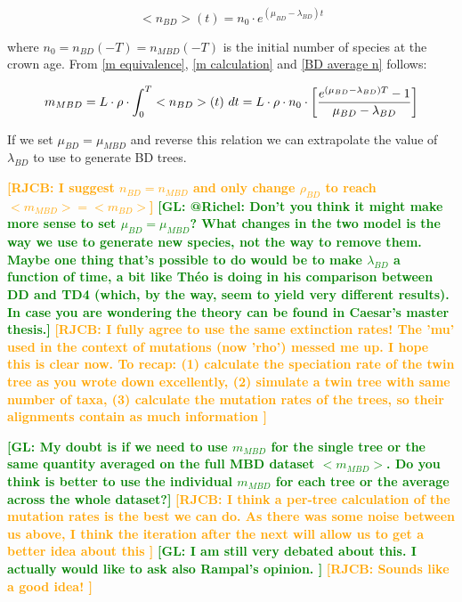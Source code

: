\documentclass{article}
\newcommand*\richel[1]{\textcolor{orange}{\textbf{[RJCB: #1]}}}
\newcommand*\gio[1]{\textcolor{green}{\textbf{[GL: #1]}}}
\begin{document}
\begin{itemize}
\begin{equation}
    <n_{BD}>(t) = n_{0} \cdot e^{(\mu_{BD} - \lambda_{BD})t} \label{BD average n}
\end{equation}

where $n_{0} = n_{BD}(-T) = n_{MBD}(-T)$ is the initial number of species at the crown age.
From \ref{m equivalence}, \ref{m calculation} and \ref{BD average n} follows:

\begin{equation}
m_{MBD} = L \cdot \rho \cdot \int_{0}^{T} <n_{BD}>(t)\ dt \\
= L \cdot \rho \cdot n_{0} \cdot \left[ \frac{e^{(\mu_{BD} - \lambda_{BD})T} - 1}{\mu_{BD} - \lambda_{BD}} \right]
\end{equation}

If we set $\mu_{BD} = \mu_{MBD}$ and reverse this relation we can extrapolate the value of $\lambda_{BD}$ to use to generate BD trees.

\richel{I suggest $n_{BD} = n_{MBD}$ and only 
change $\rho_{BD}$ to reach $<m_{MBD}> = <m_{BD}>$}
\gio{@Richel: Don't you think it might make more sense to set $\mu_{BD} = \mu_{MBD}$? What changes in the two model is the way we use to generate new species, not the way to remove them. Maybe one thing that's possible to do would be to make $\lambda_{BD}$ a function of time, a bit like Théo is doing in his comparison between DD and TD4 (which, by the way, seem to yield very different results). In case you are wondering the theory can be found in Caesar's master thesis.}
\richel{
  I fully agree to use the same extinction rates!
  The 'mu' used in the context of mutations (now 'rho') messed me up.
  I hope this is clear now. To recap: 
  (1) calculate the speciation rate of the twin tree as you wrote down excellently,
  (2) simulate a twin tree with same number of taxa,
  (3) calculate the mutation rates of the trees, 
    so their alignments contain as much information
}

\gio{My doubt is if we need to use $m_{MBD}$ for the single tree or the same
quantity averaged on the full MBD dataset $<m_{MBD}>$.
Do you think is better to use the
individual $m_{MBD}$ for each tree or the average across the whole
dataset?}
\richel{
  I think a per-tree calculation of the mutation rates 
  is the best we can do. As there was some noise between us above,
  I think the iteration after the next will allow us to get a better
  idea about this
}
\gio{
  I am still very debated about this. I actually would like to ask also Rampal's opinion.
}
\richel{
  Sounds like a good idea!
}


\end{itemize}
\end{document}
